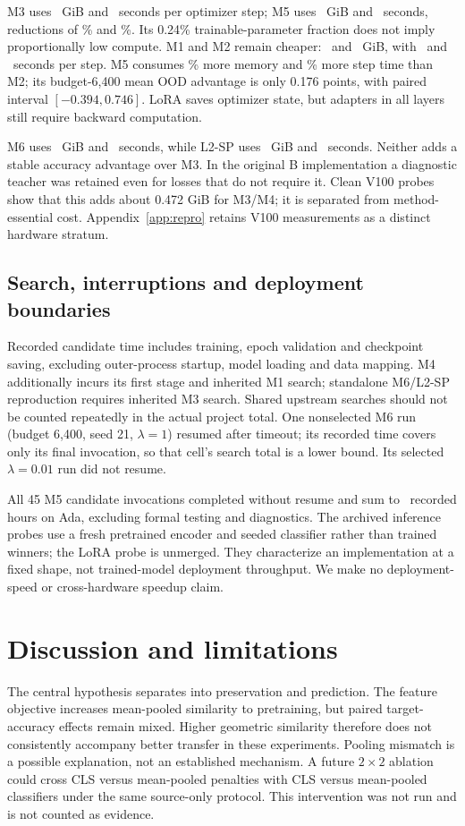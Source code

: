 \documentclass[a4paper,10pt]{article}
\begin{document}
M3 uses \FullMemory\ GiB and \FullStep\ seconds per optimizer step; M5 uses \LoRAMemory\ GiB and \LoRAStep\ seconds, reductions of \MemorySaving\% and \TimeSaving\%. Its 0.24\% trainable-parameter fraction does not imply proportionally low compute. M1 and M2 remain cheaper: \ProbeMemory\ and \PartialMemory\ GiB, with \ProbeStep\ and \PartialStep\ seconds per step. M5 consumes \MemoryVsPartial\% more memory and \TimeVsPartial\% more step time than M2; its budget-6,400 mean OOD advantage is only 0.176 points, with paired interval $[-0.394,0.746]$. LoRA saves optimizer state, but adapters in all layers still require backward computation.

M6 uses \FeatureMemory\ GiB and \FeatureStep\ seconds, while L2-SP uses \WeightMemory\ GiB and \WeightStep\ seconds. Neither adds a stable accuracy advantage over M3. In the original B implementation a diagnostic teacher was retained even for losses that do not require it. Clean V100 probes show that this adds about 0.472 GiB for M3/M4; it is separated from method-essential cost. Appendix~\ref{app:repro} retains V100 measurements as a distinct hardware stratum.

\subsection{Search, interruptions and deployment boundaries}
Recorded candidate time includes training, epoch validation and checkpoint saving, excluding outer-process startup, model loading and data mapping. M4 additionally incurs its first stage and inherited M1 search; standalone M6/L2-SP reproduction requires inherited M3 search. Shared upstream searches should not be counted repeatedly in the actual project total. One nonselected M6 run (budget 6,400, seed 21, $\lambda=1$) resumed after timeout; its recorded time covers only its final invocation, so that cell's search total is a lower bound. Its selected $\lambda=0.01$ run did not resume.

All 45 M5 candidate invocations completed without resume and sum to \LoRATrainingHours\ recorded hours on Ada, excluding formal testing and diagnostics. The archived inference probes use a fresh pretrained encoder and seeded classifier rather than trained winners; the LoRA probe is unmerged. They characterize an implementation at a fixed shape, not trained-model deployment throughput. We make no deployment-speed or cross-hardware speedup claim.

\clearpage
\section{Discussion and limitations}
The central hypothesis separates into preservation and prediction. The feature objective increases mean-pooled similarity to pretraining, but paired target-accuracy effects remain mixed. Higher geometric similarity therefore does not consistently accompany better transfer in these experiments. Pooling mismatch is a possible explanation, not an established mechanism. A future $2\times2$ ablation could cross CLS versus mean-pooled penalties with CLS versus mean-pooled classifiers under the same source-only protocol. This intervention was not run and is not counted as evidence.
\end{document}
